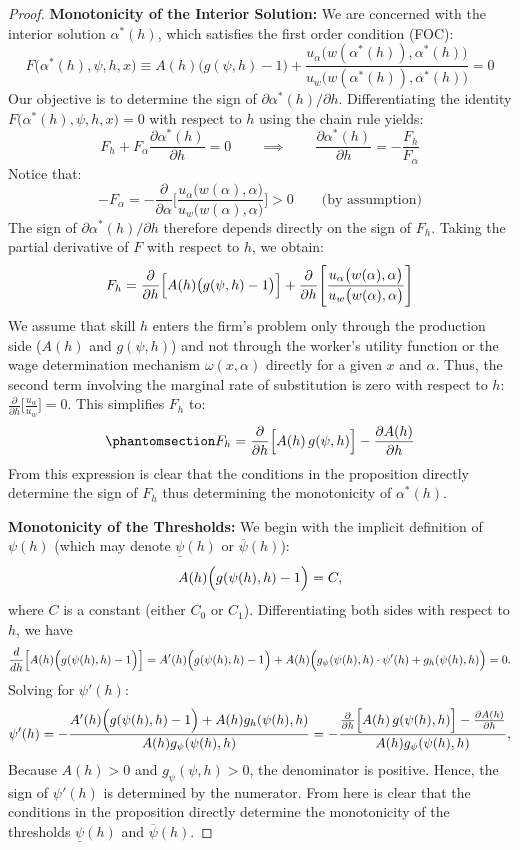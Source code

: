 \documentclass[
  11pt,
  letterpaper,
  DIV=11,
  numbers=noendperiod]{scrartcl}
\theoremstyle{plain}
\theoremstyle{remark}
\begin{document}
\begin{proof}
\textbf{Monotonicity of the Interior Solution:} We are concerned with
the interior solution \(\alpha^*(h)\), which satisfies the first order
condition (FOC): \[
F\big(\alpha^*(h),\psi,h,x\big) \equiv A(h)\big(g(\psi,h)-1\big) + \frac{u_\alpha\big(w(\alpha^*(h)),\alpha^*(h)\big)}{u_w\big(w(\alpha^*(h)),\alpha^*(h)\big)} = 0
\] Our objective is to determine the sign of
\(\partial \alpha^*(h)/\partial h\). Differentiating the identity
\(F\big(\alpha^*(h),\psi,h,x\big) = 0\) with respect to \(h\) using the
chain rule yields: \[
F_h + F_{\alpha}\frac{\partial \alpha^*(h)}{\partial h} = 0 \qquad \implies \qquad \frac{\partial \alpha^*(h)}{\partial h} = -\frac{F_h}{F_\alpha}
\] Notice that: \[
-F_\alpha = -\frac{\partial}{\partial \alpha}\Bigg[\frac{u_\alpha\big(w(\alpha),\alpha\big)}{u_w\big(w(\alpha),\alpha\big)}\Bigg] > 0 \qquad \text{(by assumption)}
\] The sign of \(\partial \alpha^*(h)/\partial h\) therefore depends
directly on the sign of \(F_h\). Taking the partial derivative of \(F\)
with respect to \(h\), we
obtain:\[F_h = \frac{\partial}{\partial h}\Big[A(h)\big(g(\psi,h)-1\big)\Big] + \frac{\partial}{\partial h}\Bigg[\frac{u_\alpha\big(w(\alpha),\alpha\big)}{u_w\big(w(\alpha),\alpha\big)}\Bigg] \\
\] We assume that skill \(h\) enters the firm's problem only through the
production side (\(A(h)\) and \(g(\psi, h)\)) and not through the
worker's utility function or the wage determination mechanism
\(\omega(x, \alpha)\) directly for a given \(x\) and \(\alpha\). Thus,
the second term involving the marginal rate of substitution is zero with
respect to \(h\):
\(\frac{\partial}{\partial h}\Bigg[\frac{u_\alpha}{u_w}\Bigg] = 0\).
This simplifies \(F_h\)
to:\begin{equation}\phantomsection\label{eq-condition-monotonicity-interior-solution}{F_h = \frac{\partial}{\partial h}\Bigl[A(h)\,g(\psi,h)\Bigr] - \frac{\partial A(h)}{\partial h}}\end{equation}
From this expression is clear that the conditions in the proposition
directly determine the sign of \(F_h\) thus determining the monotonicity
of \(\alpha^*(h)\).

\textbf{Monotonicity of the Thresholds:} We begin with the implicit
definition of \(\psi(h)\) (which may denote \(\underline{\psi}(h)\) or
\(\overline{\psi}(h)\)): \[
A(h)\Bigl(g(\psi(h),h)-1\Bigr) = C,
\] where \(C\) is a constant (either \(C_0\) or \(C_1\)).
Differentiating both sides with respect to \(h\), we
have\[\frac{d}{dh}\Bigr[A(h)\Bigl(g(\psi(h),h)-1\Bigr)\Bigr] = A'(h)\Bigl(g(\psi(h),h)-1\Bigr) + A(h)\Bigr(g_{\psi}(\psi(h),h)\cdot \psi'(h) + g_{h}(\psi(h),h)\Bigr)= 0.\]Solving
for \(\psi'(h)\): \[
\psi'(h) = -\frac{ A'(h)\Bigl(g(\psi(h),h)-1\Bigr) + A(h)g_{h}(\psi(h),h)}{A(h)g_{\psi}(\psi(h),h)} = - \frac{\frac{\partial}{\partial h}\Bigl[A(h)\,g(\psi(h),h)\Bigr] - \frac{\partial A(h)}{\partial h}}{A(h)g_{\psi}(\psi(h),h)},
\] Because \(A(h)>0\) and \(g_{\psi}(\psi,h)>0\), the denominator is
positive. Hence, the sign of \(\psi'(h)\) is determined by the
numerator. From here is clear that the conditions in the proposition
directly determine the monotonicity of the thresholds
\(\underline{\psi}(h)\) and \(\overline{\psi}(h)\).
\end{proof}
\end{document}
